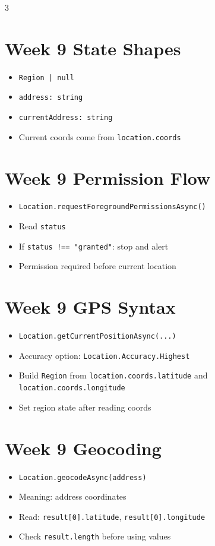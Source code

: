 \documentclass[10pt,letterpaper]{article}
\begin{document}
\begin{multicols}{3}
\section*{Week 9 State Shapes}
\begin{itemize}
  \item \texttt{Region | null}
  \item \texttt{address: string}
  \item \texttt{currentAddress: string}
  \item Current coords come from \texttt{location.coords}
\end{itemize}

\section*{Week 9 Permission Flow}
\begin{itemize}
  \item \texttt{Location.requestForegroundPermissionsAsync()}
  \item Read \texttt{status}
  \item If \texttt{status !== "granted"}: stop and alert
  \item Permission required before current location
\end{itemize}

\section*{Week 9 GPS Syntax}
\begin{itemize}
  \item \texttt{Location.getCurrentPositionAsync(...) }
  \item Accuracy option: \texttt{Location.Accuracy.Highest}
  \item Build \texttt{Region} from \texttt{location.coords.latitude} and \texttt{location.coords.longitude}
  \item Set region state after reading coords
\end{itemize}

\section*{Week 9 Geocoding}
\begin{itemize}
  \item \texttt{Location.geocodeAsync(address)}
  \item Meaning: address \textrightarrow{} coordinates
  \item Read: \texttt{result[0].latitude}, \texttt{result[0].longitude}
  \item Check \texttt{result.length} before using values
\end{itemize}


\end{multicols}
\end{document}
